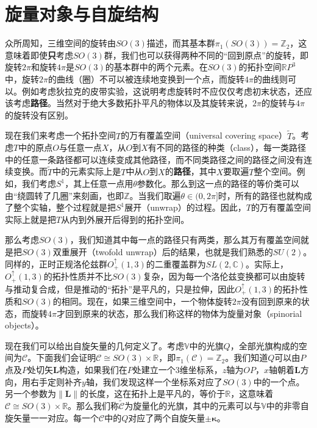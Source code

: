 \section{旋量对象与自旋结构}

众所周知，三维空间的旋转由$SO( 3)$描述，而其基本群$\pi _{1}( SO( 3)) =\mathbb{Z}_{2}$，这意味着即使\textbf{只}考虑$SO( 3)$群，我们也可以获得两种不同的“回到原点”的旋转，即旋转$2\pi $和旋转$4\pi $是$SO( 3)$的基本群中的两个元素。在$SO( 3)$的拓扑空间$\mathbb{R} P^{3}$中，旋转$2\pi $的曲线（圈）不可以被连续地变换到一个点，而旋转$4\pi $的曲线则可以。例如考虑狄拉克的皮带实验，这说明考虑旋转时不应仅仅考虑初末状态，还应该考虑\textbf{路径}。当然对于绝大多数拓扑平凡的物体以及其旋转来说，$2\pi $的旋转与$4\pi $的旋转没有区别。



现在我们来考虑一个拓扑空间$T$的万有覆盖空间（universal covering space）$\tilde{T}$。考虑$T$中的原点$O$与任意一点$X$，从$O$到$X$有不同的路径的种类（class），每一类路径中的任意一条路径都可以连续变成其他路径，而不同类路径之间的路径之间没有连续变换。而$\tilde{T}$中的元素实际上是$T$中从$O$到$X$的\textbf{路径}，其中$X$要取遍$T$整个空间。例如，我们考虑$S^{1}$，其上任意一点用$\theta $参数化。那么到这一点的路径的等价类可以由“绕圆转了几圈”来刻画，也即$\mathbb{Z}$。当我们取遍$\theta \in ( 0,2\pi ]$时，所有的路径也就构成了整个实轴，整个过程就是把$S^{1}$展开（unwrap）的过程。因此，$T$的万有覆盖空间实际上就是把$T$从内到外展开后得到的拓扑空间。



那么考虑$SO( 3)$，我们知道其中每一点的路径只有两类，那么其万有覆盖空间就是把$SO( 3)$双重展开（twofold unwrap）后的结果，也就是我们熟悉的$SU( 2)$。同样的，正时正规洛伦兹群$O_{+}^{\uparrow }( 1,3)$的二重覆盖群为$SL( 2,\mathbb{C})$。实际上，$O_{+}^{\uparrow }( 1,3)$的拓扑性质并不比$SO( 3)$复杂，因为每一个洛伦兹变换都可以由旋转与推动复合成，但是推动的“拓扑”是平凡的，只是拉伸，因此$O_{+}^{\uparrow }( 1,3)$的拓扑性质和$SO( 3)$的相同。现在，如果三维空间中，一个物体旋转$2\pi $没有回到原来的状态，而旋转$4\pi $才回到原来的状态，那么我们称这样的物体为旋量对象（spinorial objects）。



现在我们可以给出自旋矢量的几何定义了。考虑$\mathbb{V}$中的光旗$Q$，全部光旗构成的空间为$\mathcal{C}$。下面我们会证明$\mathcal{C} \cong SO( 3) \times \mathbb{R}$，即$\pi _{1}(\mathcal{C}) =\mathbb{Z}_{2}$。我们知道$Q$可以由$P$点及$P$处切矢$\boldsymbol{L}$构造，如果我们在$P$处建立一个$3$维坐标系，$z$轴为$OP$，$x$轴朝着$\boldsymbol{L}$方向，用右手定则补齐$y$轴，我们发现这样一个坐标系对应了$SO( 3)$中的一个点。另一个参数为$\| \boldsymbol{L} \| $的长度，这在拓扑上是平凡的，等价于$\mathbb{R}$，这意味着$\mathcal{C} \cong SO( 3) \times \mathbb{R}$。那么我们称$\tilde{\mathcal{C}}$为旋量化的光旗，其中的元素可以与$\mathbb{V}$中的非零自旋矢量一一对应。每一个$\mathcal{C}$中的$Q$对应了两个自旋矢量$\pm \boldsymbol{\kappa }$。



